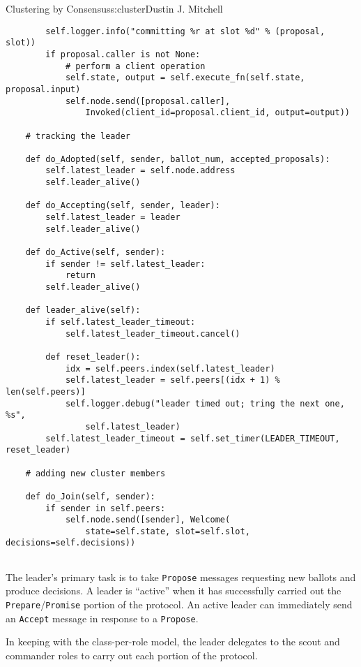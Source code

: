 \begin{aosachapter}{Clustering by Consensus}{s:cluster}{Dustin J. Mitchell}
\begin{verbatim}
        self.logger.info("committing %r at slot %d" % (proposal, slot))
        if proposal.caller is not None:
            # perform a client operation
            self.state, output = self.execute_fn(self.state, proposal.input)
            self.node.send([proposal.caller], 
                Invoked(client_id=proposal.client_id, output=output))

    # tracking the leader

    def do_Adopted(self, sender, ballot_num, accepted_proposals):
        self.latest_leader = self.node.address
        self.leader_alive()

    def do_Accepting(self, sender, leader):
        self.latest_leader = leader
        self.leader_alive()

    def do_Active(self, sender):
        if sender != self.latest_leader:
            return
        self.leader_alive()

    def leader_alive(self):
        if self.latest_leader_timeout:
            self.latest_leader_timeout.cancel()

        def reset_leader():
            idx = self.peers.index(self.latest_leader)
            self.latest_leader = self.peers[(idx + 1) % len(self.peers)]
            self.logger.debug("leader timed out; tring the next one, %s", 
                self.latest_leader)
        self.latest_leader_timeout = self.set_timer(LEADER_TIMEOUT, reset_leader)

    # adding new cluster members

    def do_Join(self, sender):
        if sender in self.peers:
            self.node.send([sender], Welcome(
                state=self.state, slot=self.slot, decisions=self.decisions))
    
\end{verbatim}

\label{leader-scout-and-commander}

The leader's primary task is to take \texttt{Propose} messages
requesting new ballots and produce decisions. A leader is ``active''
when it has successfully carried out the
\texttt{Prepare}/\texttt{Promise} portion of the protocol. An active
leader can immediately send an \texttt{Accept} message in response to a
\texttt{Propose}.

In keeping with the class-per-role model, the leader delegates to the
scout and commander roles to carry out each portion of the protocol.

\begin{verbatim}


\end{verbatim}
\end{aosachapter}
